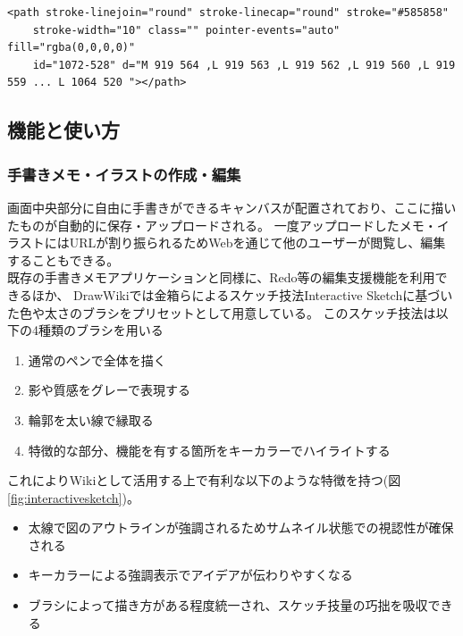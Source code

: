 \begin{lstlisting}[caption=図\ref{fig:tegakipath}の実体, label=code:tegakipathcode]
    <path stroke-linejoin="round" stroke-linecap="round" stroke="#585858"
    stroke-width="10" class="" pointer-events="auto" fill="rgba(0,0,0,0)"
    id="1072-528" d="M 919 564 ,L 919 563 ,L 919 562 ,L 919 560 ,L 919 559 ... L 1064 520 "></path>
\end{lstlisting}


\subsection{機能と使い方}

\subsubsection{手書きメモ・イラストの作成・編集}

画面中央部分に自由に手書きができるキャンバスが配置されており、ここに描いたものが自動的に保存・アップロードされる。
一度アップロードしたメモ・イラストにはURLが割り振られるためWebを通じて他のユーザーが閲覧し、編集することもできる。
\\
既存の手書きメモアプリケーションと同様に、Redo等の編集支援機能を利用できるほか、
DrawWikiでは金箱らによるスケッチ技法Interactive Sketch\cite{130004638060}に基づいた色や太さのブラシをプリセットとして用意している。
このスケッチ技法は以下の4種類のブラシを用いる
\begin{enumerate}
    \item 通常のペンで全体を描く
    \item 影や質感をグレーで表現する
    \item 輪郭を太い線で縁取る
    \item 特徴的な部分、機能を有する箇所をキーカラーでハイライトする
\end{enumerate}
これによりWikiとして活用する上で有利な以下のような特徴を持つ(図\ref{fig:interactivesketch})。
\begin{itemize}
    \item 太線で図のアウトラインが強調されるためサムネイル状態での視認性が確保される
    \item キーカラーによる強調表示でアイデアが伝わりやすくなる
    \item ブラシによって描き方がある程度統一され、スケッチ技量の巧拙を吸収できる
\end{itemize}

